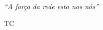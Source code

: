 \documentclass[a4paper, 11pt, oneside]{Relatorio_sem}  %
\begin{document}
\null\vfill
\textit{``A força da rede esta nos nós''}

\begin{flushright}
TC
\end{flushright}

\vfill\vfill\vfill\vfill\vfill\vfill\null
\clearpage  %

\pagestyle{fancy}  %







\appendix %




\backmatter
\nocite{*}
\label{Bibliography}
\end{document}
